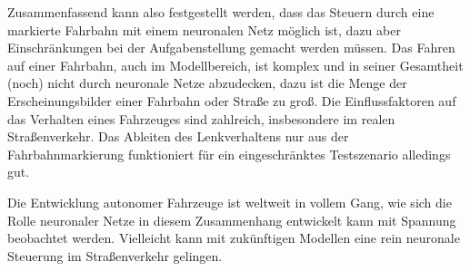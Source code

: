 Zusammenfassend kann also festgestellt werden, dass das Steuern durch eine markierte Fahrbahn mit einem neuronalen Netz möglich ist, dazu aber Einschränkungen bei der Aufgabenstellung gemacht werden müssen. Das Fahren auf einer Fahrbahn, auch im Modellbereich, ist komplex und in seiner Gesamtheit (noch) nicht durch neuronale Netze abzudecken, dazu ist die Menge der Erscheinungsbilder einer Fahrbahn oder Straße zu groß. Die Einflussfaktoren auf das Verhalten eines Fahrzeuges sind zahlreich, insbesondere im realen Straßenverkehr. Das Ableiten des Lenkverhaltens nur aus der Fahrbahnmarkierung funktioniert für ein eingeschränktes Testszenario alledings gut.

Die Entwicklung autonomer Fahrzeuge ist weltweit in vollem Gang, wie sich die Rolle neuronaler Netze in diesem Zusammenhang entwickelt kann mit Spannung beobachtet werden. Vielleicht kann mit zukünftigen Modellen eine rein neuronale Steuerung im Straßenverkehr gelingen.

